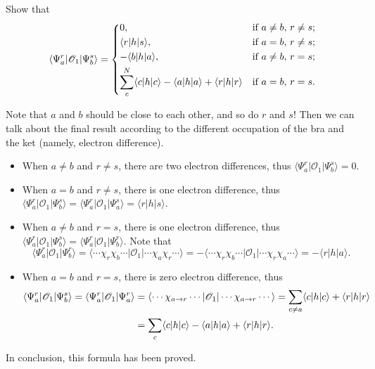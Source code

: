 \documentclass[a4paper]{book}
\begin{document}
	\begin{exercise}
	Show that
	\[ \langle \Psi^r_a| \mathscr{O}_1 | \Psi^s_b \rangle =
	\begin{dcases}
		0, & \text{if } a \neq b , \, r \neq s ; \\ 
		\langle r | h | s \rangle, & \text{if } a = b , \, r \neq s ; \\ 
		-\langle b | h | a \rangle, & \text{if } a \neq b , \, r = s ; \\
		\sum_c^N \langle c | h | c \rangle - \langle a | h | a \rangle + \langle r | h | r \rangle & \text{if } a = b , \, r = s. 
	\end{dcases}
	\]	
	\end{exercise}
	
	\begin{solution}
	Note that $a$ and $b$ should be close to each other, and so do $r$ and $s$! Then we can talk about the final result according to the different occupation of the bra and the ket (namely, electron difference).
	\begin{itemize}
	
	\item When $a \neq b$ and $r \neq s$, there are two electron differences, thus $\langle \Psi^r_a| \mathscr{O}_1 | \Psi^s_b \rangle = 0$.
	
	\item When $a = b$ and $r \neq s$, there is one electron difference, thus $\langle \Psi^r_a| \mathscr{O}_1 | \Psi^s_b \rangle = \langle \Psi^r_a | \mathscr{O}_1 | \Psi^s_a \rangle = \langle r | h | s \rangle$.
	
	\item When $a \neq b$ and $r = s$, there is one electron difference, thus $\langle \Psi^r_a | \mathscr{O}_1 | \Psi^s_b \rangle = \langle \Psi^r_a | \mathscr{O}_1 | \Psi^r_b \rangle$. Note that
	\begin{equation}
		\langle \Psi^r_a | \mathscr{O}_1 | \Psi^r_b \rangle = \langle \cdots \chi_r \chi_b \cdots | \mathscr{O}_1 | \cdots \chi_a \chi_r \cdots \rangle = -\langle \cdots \chi_r \chi_b \cdots | \mathscr{O}_1 | \cdots \chi_r\chi_a  \cdots \rangle = -\langle r | h | a \rangle.
	\end{equation}

	\item When $a = b$ and $r = s$, there is zero electron difference, thus
	\begin{align}
		\langle \Psi^r_a | \mathscr{O}_1 | \Psi^s_b \rangle = \langle \Psi^r_a | \mathscr{O}_1 | \Psi^r_a \rangle &= \langle \cdots \chi_{a \rightarrow r} \cdots | \mathscr{O}_1 | \cdots \chi_{a \rightarrow r}  \cdots \rangle = \sum_{c\neq a} \langle c | h | c \rangle + \langle r | h | r \rangle \notag \\
		&= \sum_{c} \langle c | h | c \rangle - \langle a | h | a \rangle + \langle r | h | r \rangle.
	\end{align}

	\end{itemize}
	In conclusion, this formula has been proved.
	\end{solution}
	
\end{document}
